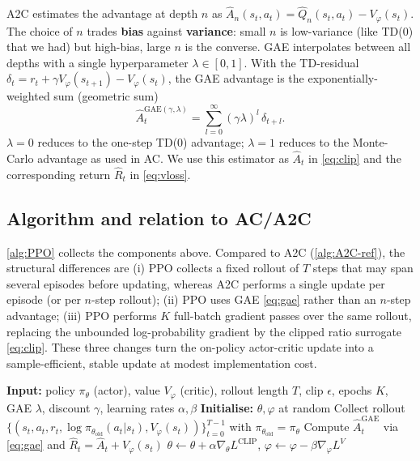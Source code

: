 \documentclass{article}
\theoremstyle{plain}
\theoremstyle{definition}
\theoremstyle{remark}
\begin{document}
A2C estimates the advantage at depth $n$ as $\hat A_n(s_t,a_t)=\hat Q_n(s_t,a_t)-V_\varphi(s_t)$. The choice of $n$ trades \textbf{bias} against \textbf{variance}: small $n$ is low-variance (like TD(0) that we had) but high-bias, large $n$ is the converse. GAE \cite{schulman2016gae} interpolates between all depths with a single hyperparameter $\lambda\in[0,1]$. With the TD-residual $\delta_t = r_t + \gamma V_\varphi(s_{t+1}) - V_\varphi(s_t)$, the GAE advantage is the exponentially-weighted sum (geometric sum)
{\setlength{\abovedisplayskip}{6pt}%
\setlength{\belowdisplayskip}{15pt}%
\setlength{\abovedisplayshortskip}{6pt}%
\setlength{\belowdisplayshortskip}{15pt}%
\begin{equation}
\hat A_t^{\mathrm{GAE}(\gamma,\lambda)} = \sum_{l=0}^{\infty} (\gamma\lambda)^{l}\,\delta_{t+l}.
\label{eq:gae}
\end{equation}}
$\lambda=0$ reduces to the one-step TD(0) advantage; $\lambda=1$ reduces to the Monte-Carlo advantage as used in AC. We use this estimator as $\hat A_t$ in \cref{eq:clip} and the corresponding return $\hat R_t$ in \cref{eq:vloss}.

\subsection{Algorithm and relation to AC/A2C}\label{sec:theory:alg}

\autoref{alg:PPO} collects the components above. Compared to A2C (\autoref{alg:A2C-ref}), the structural differences are (i) PPO collects a fixed rollout of $T$ steps that may span several episodes before updating, whereas A2C performs a single update per episode (or per $n$-step rollout); (ii) PPO uses GAE \cref{eq:gae} rather than an $n$-step advantage; (iii) PPO performs $K$ full-batch gradient passes over the same rollout, replacing the unbounded log-probability gradient by the clipped ratio surrogate \cref{eq:clip}. These three changes turn the on-policy actor-critic update into a sample-efficient, stable update at modest implementation cost.

\begingroup
\setlength{\intextsep}{30pt}
\setlength{\textfloatsep}{0pt}
\begin{algorithm}[H]
    \caption{PPO-clipped with GAE}
    \begin{algorithmic}
        \STATE \textbf{Input:} policy $\pi_\theta$ (actor), value $V_\varphi$ (critic), rollout length $T$, clip $\epsilon$, epochs $K$, GAE $\lambda$, discount $\gamma$, learning rates $\alpha,\beta$
        \STATE \textbf{Initialise:} $\theta,\varphi$ at random
            \STATE Collect rollout $\{(s_t,a_t,r_t,\log\pi_{\theta_{\mathrm{old}}}(a_t|s_t),V_\varphi(s_t))\}_{t=0}^{T-1}$ with $\pi_{\theta_{\mathrm{old}}}=\pi_\theta$
            \STATE Compute $\hat A_t^{\mathrm{GAE}}$ via \cref{eq:gae} and $\hat R_t=\hat A_t+V_\varphi(s_t)$
                \STATE $\theta\!\leftarrow\!\theta\!+\!\alpha\nabla_\theta L^{\mathrm{CLIP}}$, $\varphi\!\leftarrow\!\varphi\!-\!\beta\nabla_\varphi L^{V}$
            \ENDFOR
        \ENDWHILE
    \end{algorithmic}
    \label{alg:PPO}
\end{algorithm}
\endgroup
\end{document}
